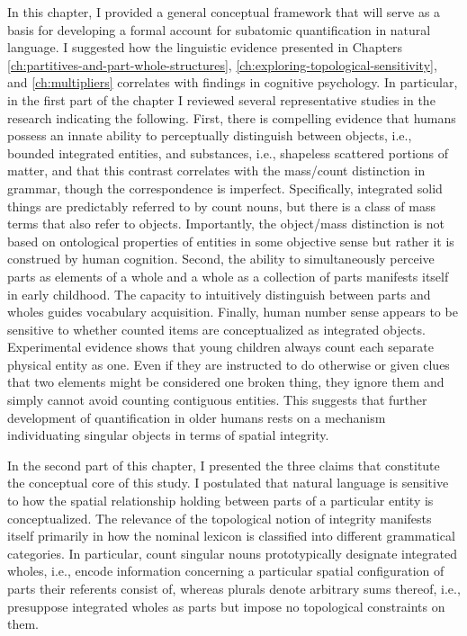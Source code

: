 In this chapter, I provided a general conceptual framework that will serve as a basis for developing a formal account for subatomic quantification in natural language. I suggested how the linguistic evidence presented in Chapters \ref{ch:partitives-and-part-whole-structures}, \ref{ch:exploring-topological-sensitivity}, and \ref{ch:multipliers} correlates with findings in cognitive psychology. In particular, in the first part of the chapter I reviewed several representative studies in the research indicating the following. First, there is compelling evidence that humans possess an innate ability to perceptually distinguish between objects, i.e., bounded integrated entities, and substances, i.e., shapeless scattered portions of matter, and that this contrast correlates with the mass/count distinction in grammar, though the correspondence is imperfect. Specifically, integrated solid things are predictably referred to by count nouns, but there is a class of mass terms that also refer to objects. Importantly, the object/mass distinction is not based on ontological properties of entities in some objective sense but rather it is construed by human cognition. Second, the ability to simultaneously perceive parts as elements of a whole and a whole as a collection of parts manifests itself in early childhood. The capacity to intuitively distinguish between parts and wholes guides vocabulary acquisition. Finally, human number sense appears to be sensitive to whether counted items are conceptualized as integrated objects. Experimental evidence shows that young children always count each separate physical entity as one. Even if they are instructed to do otherwise or given clues that two elements might be considered one broken thing, they ignore them and simply cannot avoid counting contiguous entities. This suggests that further development of quantification in older humans rests on a mechanism  individuating singular objects in terms of spatial integrity.

In the second part of this chapter, I presented the three claims that constitute the conceptual core of this study. I postulated that natural language is sensitive to how the spatial relationship holding between parts of a particular entity is conceptualized. The relevance of the topological notion of integrity manifests itself primarily in how the nominal lexicon is classified into different grammatical categories. In particular, count singular nouns prototypically designate integrated wholes, i.e., encode information concerning a particular spatial configuration of parts their referents consist of, whereas plurals denote arbitrary sums thereof, i.e., presuppose integrated wholes as parts but impose no topological constraints on them.

